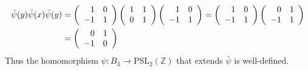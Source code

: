 \documentclass{article}
\begin{document}
\begin{Answer}
\begin{enumerate}[(a)]
{\begin{align*}
    \bar{\psi}(y) \bar{\psi}(x) \bar{\psi}(y)
    &=
    \left(\begin{array}{r r}
      1 & 0 \\
     -1 & 1
    \end{array}\right)
    \left(\begin{array}{r r}
      1 & 1 \\
      0 & 1
    \end{array}\right)
    \left(\begin{array}{r r}
      1 & 0 \\
     -1 & 1
    \end{array}\right)
    =
    \left(\begin{array}{r r}
      1 & 0 \\
     -1 & 1
    \end{array}\right)
    \left(\begin{array}{r r}
      0 & 1 \\
     -1 & 1
    \end{array}\right)
    \\ &=
    \left(\begin{array}{r r}
      0 & 1 \\
     -1 & 0
    \end{array}\right)
    \end{align*}
    Thus the homomorphism $\psi : B_3 \to \mathrm{PSL}_2(\mathbb{Z})$
    that extends $\bar{\psi}$ is well-defined.
  }
%
\end{enumerate}
\end{Answer}
\end{document}
